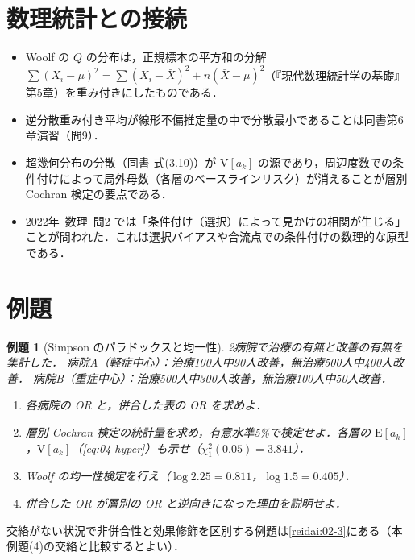 \documentclass[a4paper,11pt,openany]{ltjsbook}
\newtheorem{reidai}{例題}[chapter]
\newcommand{\kakomonSM}[2]{\mbox{#1年 数理 問#2}}
\newcommand{\E}{\mathrm{E}}
\newcommand{\V}{\mathrm{V}}
\begin{document}
\section{数理統計との接続}\label{sec:07-link}
\begin{linkbox}
\begin{itemize}
\item Woolf の $Q$ の分布は，正規標本の平方和の分解 $\sum(X_i-\mu)^2=\sum(X_i-\bar X)^2+n(\bar X-\mu)^2$（『現代数理統計学の基礎』第5章）を重み付きにしたものである．
\item 逆分散重み付き平均が線形不偏推定量の中で分散最小であることは同書第6章演習（問9）．
\item 超幾何分布の分散（同書 式(3.10)）が $\V[a_k]$ の源であり，周辺度数での条件付けによって局外母数（各層のベースラインリスク）が消えることが層別 Cochran 検定の要点である．
\item \kakomonSM{2022}{2} では「条件付け（選択）によって見かけの相関が生じる」ことが問われた．これは選択バイアスや合流点での条件付けの数理的な原型である．
\end{itemize}
\end{linkbox}

\section{例題}\label{sec:07-ex}
\begin{reidai}[Simpson のパラドックスと均一性]\label{reidai:07-1}
2病院で治療の有無と改善の有無を集計した．
病院A（軽症中心）：治療100人中90人改善，無治療500人中400人改善．
病院B（重症中心）：治療500人中300人改善，無治療100人中50人改善．
\begin{enumerate}[label=(\arabic*)]
\item 各病院の OR と，併合した表の OR を求めよ．
\item 層別 Cochran 検定の統計量を求め，有意水準5\%で検定せよ．各層の $\E[a_k]$，$\V[a_k]$（\cref{eq:04-hyper}）も示せ（$\chi^2_1(0.05)=3.841$）．
\item Woolf の均一性検定を行え（$\log2.25=0.811$，$\log1.5=0.405$）．
\item 併合した OR が層別の OR と逆向きになった理由を説明せよ．
\end{enumerate}
\end{reidai}
交絡がない状況で非併合性と効果修飾を区別する例題は\cref{reidai:02-3}にある（本例題(4)の交絡と比較するとよい）．
\end{document}
